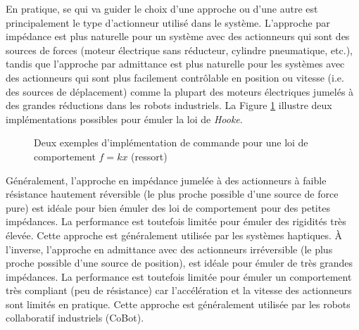 En pratique, se qui va guider le choix d'une approche ou d'une autre est principalement le type d'actionneur utilisé dans le système. L'approche par impédance est plus naturelle pour un système avec des actionneurs qui sont des sources de forces (moteur électrique sans réducteur, cylindre pneumatique, etc.), tandis que l'approche par admittance est plus naturelle pour les systèmes avec des actionneurs qui sont plus facilement contrôlable en position ou vitesse (i.e. des sources de déplacement) comme la plupart des moteurs électriques jumelés à des grandes réductions dans les robots industriels. La Figure \ref{fig:impedanceadmitancesex} illustre deux implémentations possibles pour émuler la loi de \textit{Hooke}.
\begin{figure}[H]
        \centering
				\hspace{5pt}
        \caption{Deux exemples d'implémentation de commande pour une loi de comportement $f=kx$ (ressort)}
				\label{fig:impedanceadmitancesex}
\end{figure}
Généralement, l'approche en impédance jumelée à des actionneurs à faible résistance hautement réversible (le plus proche possible d'une source de force pure) est idéale pour bien émuler des loi de comportement pour des petites impédances. La performance est toutefois limitée pour émuler des rigidités très élevée. Cette approche est généralement utilisée par les systèmes haptiques. À l'inverse, l'approche en admittance avec des actionneurs irréversible (le plus proche possible d'une source de position), est idéale pour émuler de très grandes impédances. La performance est toutefois limitée pour émuler un comportement très compliant (peu de résistance) car l'accélération et la vitesse des actionneurs sont limités en pratique. Cette approche est généralement utilisée par les robots collaboratif industriels (CoBot). 

